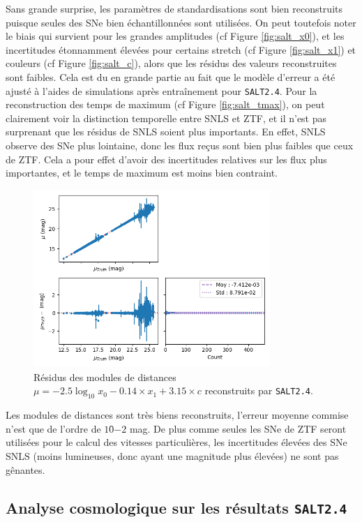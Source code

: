 \documentclass{book}
\def\saltd{\texttt{SALT2.4}\xspace}
\begin{document}
Sans grande surprise, les paramètres de standardisations sont bien reconstruits puisque seules des SNe bien échantillonnées sont utilisées. On peut toutefois noter le biais qui survient pour les grandes amplitudes (cf Figure \ref{fig:salt_x0}), et les incertitudes étonnamment élevées pour certains stretch (cf Figure \ref{fig:salt_x1}) et couleurs (cf Figure \ref{fig:salt_c}), alors que les résidus des valeurs reconstruites sont faibles. Cela est du en grande partie au fait que le modèle d'erreur a été ajusté à l'aides de simulations après entraînement pour \saltd. Pour la reconstruction des temps de maximum (cf Figure \ref{fig:salt_tmax}), on peut clairement voir la distinction temporelle entre SNLS et ZTF, et il n'est pas surprenant que les résidus de SNLS soient plus importants. En effet, SNLS observe des SNe plus lointaine, donc les flux reçus sont bien plus faibles que ceux de ZTF. Cela a pour effet d'avoir des incertitudes relatives sur les flux plus importantes, et le temps de maximum est moins bien contraint.

\begin{figure}
    \centering
    \includegraphics[width=0.8\textwidth]{figures/salt_mu.png}
    \caption{Résidus des modules de distances $\mu = -2.5\log_{10} x_0 - 0.14 \times x_1 + 3.15 \times  c$ reconstruits par \saltd.}
    \label{fig:salt_mu}
\end{figure}

Les modules de distances sont très biens reconstruits, l'erreur moyenne commise n'est que de l'ordre de $10̂{-2}$ mag. De plus comme seules les SNe de ZTF seront utilisées pour le calcul des vitesses particulières, les incertitudes élevées des SNe SNLS (moins lumineuses, donc ayant une magnitude plus élevées) ne sont pas gênantes.

\subsection{Analyse cosmologique sur les résultats \saltd}
\end{document}
